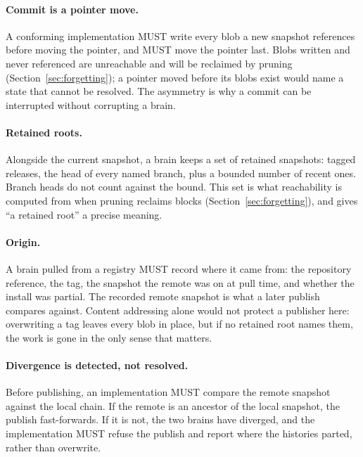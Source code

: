 \documentclass[11pt,a4paper]{article}
\begin{document}
\paragraph{Commit is a pointer move.}
A conforming implementation MUST write every blob a new snapshot references
before moving the pointer, and MUST move the pointer last. Blobs written and
never referenced are unreachable and will be reclaimed by pruning
(Section~\ref{sec:forgetting}); a pointer moved before its blobs exist would
name a state that cannot be resolved. The asymmetry is why a commit can be interrupted without corrupting a brain.

\paragraph{Retained roots.}
Alongside the current snapshot, a brain keeps a set of retained snapshots:
tagged releases, the head of every named branch, plus a bounded number of
recent ones. Branch heads do not count against the bound. This set is what
reachability is computed from when pruning reclaims blocks
(Section~\ref{sec:forgetting}), and gives ``a retained root'' a precise meaning.

\paragraph{Origin.}
A brain pulled from a registry MUST record where it came from: the repository
reference, the tag, the snapshot the remote was on at pull time, and whether the
install was partial. The recorded remote snapshot is what a later publish
compares against. Content addressing alone would not protect a publisher here:
overwriting a tag leaves every blob in place, but if no retained root names
them, the work is gone in the only sense that matters.

\paragraph{Divergence is detected, not resolved.}
Before publishing, an implementation MUST compare the remote snapshot against
the local chain. If the remote is an ancestor of the local snapshot, the publish
fast-forwards. If it is not, the two brains have diverged, and the
implementation MUST refuse the publish and report where the histories parted,
rather than overwrite.
\end{document}
